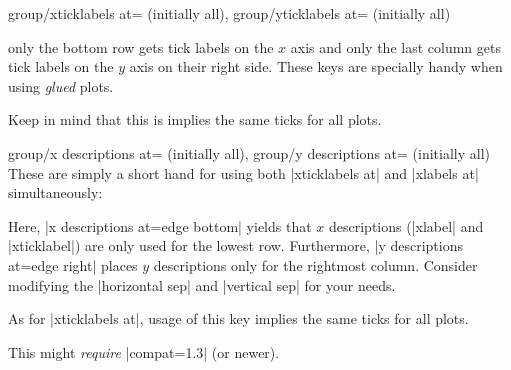 {\begin{pgfplotskeylist}{%
	group/xticklabels at= (initially all),%
	group/yticklabels at= (initially all)}
\begin{codeexample}
\pgfplotsset{group/xticklabels at=edge bottom,group/yticklabels at=edge right}
\end{codeexample}
only the bottom row gets tick labels on the $x$ axis and only the last column gets tick labels on the $y$ axis on their right side. These keys are
specially handy when using \textit{glued} plots.

	Keep in mind that this is implies the same ticks for all plots.
\end{pgfplotskeylist}

\begin{pgfplotskeylist}{%
	group/x descriptions at= (initially all),%
	group/y descriptions at= (initially all)}
  These are simply a short hand for using both |xticklabels at| and |xlabels at| simultaneously:

\begin{codeexample}[]
\end{codeexample}

Here, |x descriptions at=edge bottom| yields that $x$ descriptions (|xlabel| and |xticklabel|) are only used for the lowest row. Furthermore, |y descriptions at=edge right| places $y$ descriptions only for the rightmost column. Consider modifying the |horizontal sep| and |vertical sep| for your needs.

	As for |xticklabels at|, usage of this key implies the same ticks for all plots.

	This might \emph{require} |compat=1.3| (or newer).
\end{pgfplotskeylist}

}
